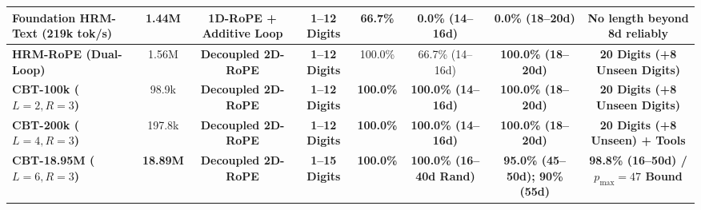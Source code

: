 \documentclass[10pt,twocolumn]{article}
\begin{document}
\begin{table}[t]
{\begin{tabular}{@{}lccccccc@{}}
Foundation HRM-Text (219k tok/s) & 1.44M & 1D-RoPE + Additive Loop & 1--12 Digits & 66.7\% & 0.0\% (14--16d) & 0.0\% (18--20d) & No length beyond 8d reliably \\
\midrule
\textbf{HRM-RoPE (Dual-Loop)} & 1.56M & \textbf{Decoupled 2D-RoPE} & \textbf{1--12 Digits} & 100.0\% & 66.7\% (14--16d) & \textbf{100.0\% (18--20d)} & \textbf{20 Digits (+8 Unseen Digits)} \\
\textbf{CBT-100k ($L=2, R=3$)} & 98.9k & \textbf{Decoupled 2D-RoPE} & \textbf{1--12 Digits} & \textbf{100.0\%} & \textbf{100.0\% (14--16d)} & \textbf{100.0\% (18--20d)} & \textbf{20 Digits (+8 Unseen Digits)} \\
\textbf{CBT-200k ($L=4, R=3$)} & 197.8k & \textbf{Decoupled 2D-RoPE} & \textbf{1--12 Digits} & \textbf{100.0\%} & \textbf{100.0\% (14--16d)} & \textbf{100.0\% (18--20d)} & \textbf{20 Digits (+8 Unseen) + Tools} \\
\textbf{CBT-18.95M ($L=6, R=3$)} & \textbf{18.89M} & \textbf{Decoupled 2D-RoPE} & \textbf{1--15 Digits} & \textbf{100.0\%} & \textbf{100.0\% (16--40d Rand)} & \textbf{95.0\% (45--50d); 90\% (55d)} & \textbf{98.8\% (16--50d) / $p_{\max}=47$ Bound} \\
\bottomrule
\end{tabular}%
}
\end{table}
\end{document}
